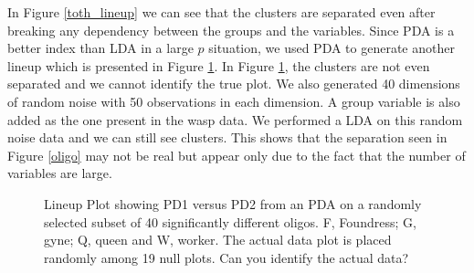 \documentclass[12]{article}
\begin{document}
In Figure \ref{toth_lineup} we can see that the clusters are separated even after breaking any dependency between the groups and the variables. Since PDA is a better index than LDA in a large $p$ situation, we used PDA to generate another lineup which is presented in Figure \ref{toth_pda}. In Figure \ref{toth_pda}, the clusters are not even separated and we cannot identify the true plot. We also generated 40 dimensions of random noise with 50 observations in each dimension. A group variable is also added as the one present in the wasp data. We performed a LDA on this random noise data and we can still see clusters.  This shows that the separation seen in Figure \ref{oligo} may not be real but appear only due to the fact that the number of variables are large.

\begin{figure}[hbtp]
   \centering
       \caption{Lineup Plot showing PD1 versus PD2 from an PDA on a randomly selected subset of 40 significantly different oligos. F, Foundress; G, gyne; Q, queen and W, worker. The actual data plot is placed randomly among 19 null plots. Can you identify the actual data?  }
       \label{toth_pda}
\end{figure}   
\end{document}
